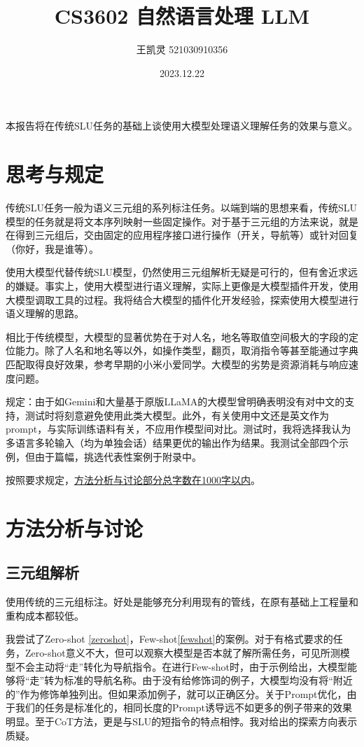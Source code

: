 \documentclass{article}
\begin{document}
	\title{CS3602 自然语言处理 LLM}
	\author{王凯灵 521030910356}
	\date{2023.12.22}
	\maketitle

	本报告将在传统SLU任务的基础上谈使用大模型处理语义理解任务的效果与意义。
	\section{思考与规定}
		传统SLU任务一般为语义三元组的系列标注任务。以端到端的思想来看，传统SLU模型的任务就是将文本序列映射一些固定操作。对于基于三元组的方法来说，就是在得到三元组后，交由固定的应用程序接口进行操作（开关，导航等）或针对回复（你好，我是谁等）。
		
		使用大模型代替传统SLU模型，仍然使用三元组解析无疑是可行的，但有舍近求远的嫌疑。事实上，使用大模型进行语义理解，实际上更像是大模型插件开发，使用大模型调取工具的过程。我将结合大模型的插件化开发经验，探索使用大模型进行语义理解的思路。
		
		相比于传统模型，大模型的显著优势在于对人名，地名等取值空间极大的字段的定位能力。除了人名和地名等以外，如操作类型，翻页，取消指令等甚至能通过字典匹配取得良好效果，参考早期的小米小爱同学。大模型的劣势是资源消耗与响应速度问题。
		
		规定：由于如Gemini和大量基于原版LLaMA的大模型曾明确表明没有对中文的支持，测试时将刻意避免使用此类大模型。此外，有关使用中文还是英文作为prompt，与实际训练语料有关，不应用作模型间对比。测试时，我将选择我认为多语言多轮输入（均为单独会话）结果更优的输出作为结果。我测试全部四个示例，但由于篇幅，挑选代表性案例于附录中。
		
		按照要求规定，\underline{方法分析与讨论部分总字数在1000字以内}。
	\section{方法分析与讨论}
		\subsection{三元组解析}
			使用传统的三元组标注。好处是能够充分利用现有的管线，在原有基础上工程量和重构成本都较低。
			
			我尝试了Zero-shot\label{zs} \ref{zeroshot}，Few-shot\ref{fewshot}的案例。对于有格式要求的任务，Zero-shot意义不大，但可以观察大模型是否本就了解所需任务，可见所测模型不会主动将“走”转化为导航指令。在进行Few-shot时，由于示例给出，大模型能够将“走”转为标准的导航名称。由于没有给修饰词的例子，大模型均没有将“附近的”作为修饰单独列出。但如果添加例子，就可以正确区分。关于Prompt优化，由于我们的任务是标准化的，相同长度的Prompt诱导远不如更多的例子带来的效果明显。至于CoT方法，更是与SLU的短指令的特点相悖。我对给出的探索方向表示质疑。
			
\end{document}
